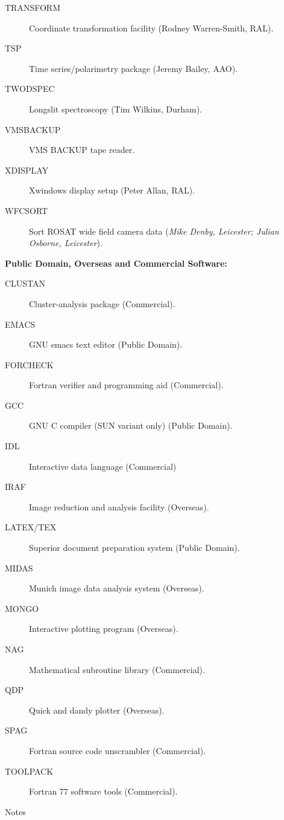\begin{description}
\item[TRANSFORM] Coordinate transformation facility (Rodney Warren-Smith, RAL).
\item[TSP] Time series/polarimetry package (Jeremy Bailey, AAO).
\item[TWODSPEC] Longslit spectroscopy (Tim Wilkins, Durham).
\item[VMSBACKUP] VMS BACKUP tape reader.
\item[XDISPLAY] Xwindows display setup (Peter Allan, RAL).
\item[WFCSORT] Sort ROSAT wide field camera data ({\em Mike Denby, Leicester;
Julian Osborne, Leicester}).
\end{description}


\vspace{5mm}
\begin{center}
{\bf Public Domain, Overseas and Commercial Software:}
\end{center}

\begin{description}
\item[CLUSTAN] Cluster-analysis package (Commercial).
\item[EMACS] GNU emacs text editor (Public Domain).
\item[FORCHECK] Fortran verifier and programming aid (Commercial).
\item[GCC] GNU C compiler (SUN variant only) (Public Domain).
\item[IDL] Interactive data language (Commercial)
\item[IRAF] Image reduction and analysis facility (Overseas).
\item[LATEX/TEX] Superior document preparation system (Public Domain).
\item[MIDAS] Munich image data analysis system (Overseas).
\item[MONGO] Interactive plotting program (Overseas).
\item[NAG] Mathematical subroutine library (Commercial).
\item[QDP] Quick and dandy plotter (Overseas).
\item[SPAG] Fortran source code unscrambler (Commercial).
\item[TOOLPACK] Fortran 77 software tools (Commercial).
\end{description}


\vspace{5mm}
\begin{center}
{\large\sc Notes}
\end{center}

